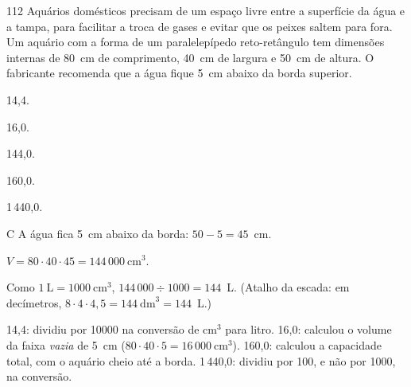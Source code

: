 \secaoineditas

\begin{questaoinedita}{1}{12}
Aquários domésticos precisam de um espaço livre entre a superfície da água e a
tampa, para facilitar a troca de gases e evitar que os peixes saltem para fora.
Um aquário com a forma de um paralelepípedo reto-retângulo tem dimensões
internas de 80~cm de comprimento, 40~cm de largura e 50~cm de altura. O
fabricante recomenda que a água fique 5~cm abaixo da borda superior.

\begin{alternativas*}[5]
  \item 14,4.
  \item 16,0.
  \item 144,0.
  \item 160,0.
  \item 1\,440,0.
\end{alternativas*}
\end{questaoinedita}
\begin{resolucao}{C}
 A água fica 5~cm abaixo da borda: $50 - 5 = 45$~cm.

 $V = 80\cdot 40\cdot 45 = 144\,000\ \text{cm}^3$.

 Como $1\ \text{L} = 1000\ \text{cm}^3$,
$144\,000 \div 1000 = 144$~L. (Atalho da escada: em decímetros,
$8\cdot 4\cdot 4{,}5 = 144\ \text{dm}^3 = 144$~L.)

\begin{distratores}
 14,4: dividiu por \num{10000} na conversão de cm$^3$ para litro.
 16,0: calculou o volume da faixa \emph{vazia} de 5~cm
($80\cdot 40\cdot 5 = 16\,000\ \text{cm}^3$).
 160,0: calculou a capacidade total, com o aquário cheio até a borda.
 1\,440,0: dividiu por 100, e não por 1000, na conversão.
\end{distratores}
\end{resolucao}

